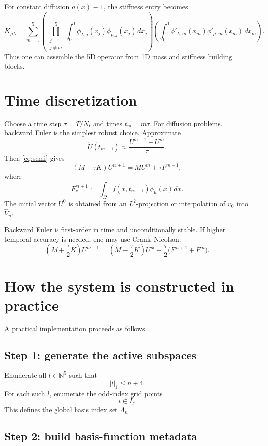 \documentclass[11pt,a4paper]{report}
\begin{document}
For constant diffusion $a(x)\equiv 1$, the stiffness entry becomes
$$
K_{\mu\lambda}
=
\sum_{m=1}^5
\left(
\prod_{\substack{j=1\\j\ne m}}^5
\int_0^1 \phi_{\lambda,j}(x_j)\phi_{\mu,j}(x_j)\,dx_j
\right)
\left(
\int_0^1 \phi'_{\lambda,m}(x_m)\phi'_{\mu,m}(x_m)\,dx_m
\right).
$$
Thus one can assemble the 5D operator from 1D mass and stiffness building blocks.

\section{Time discretization}

Choose a time step $\tau=T/N_t$ and times $t_m=m\tau$. For diffusion problems, backward Euler is the simplest robust choice. Approximate
$$
\dot U(t_{m+1}) \approx \frac{U^{m+1}-U^m}{\tau}.
$$
Then \eqref{eq:semi} gives
\begin{equation}
(M+\tau K)U^{m+1} = M U^m + \tau F^{m+1},
\label{eq:BE}
\end{equation}
where
$$
F^{m+1}_\mu := \int_\Omega f(x,t_{m+1})\phi_\mu(x)\,dx.
$$
The initial vector $U^0$ is obtained from an $L^2$-projection or interpolation of $u_0$ into $\widehat V_n$.

Backward Euler is first-order in time and unconditionally stable. If higher temporal accuracy is needed, one may use Crank--Nicolson:
$$
\left(M+\frac{\tau}{2}K\right)U^{m+1}
=
\left(M-\frac{\tau}{2}K\right)U^m
+
\frac{\tau}{2}\bigl(F^{m+1}+F^m\bigr).
$$

\section{How the system is constructed in practice}

A practical implementation proceeds as follows.

\subsection{Step 1: generate the active subspaces}

Enumerate all $l\in\mathbb{N}^5$ such that
$$
|l|_1\le n+4.
$$
For each such $l$, enumerate the odd-index grid points
$$
i\in I_l.
$$
This defines the global basis index set $\Lambda_n$.

\subsection{Step 2: build basis-function metadata}
\end{document}
